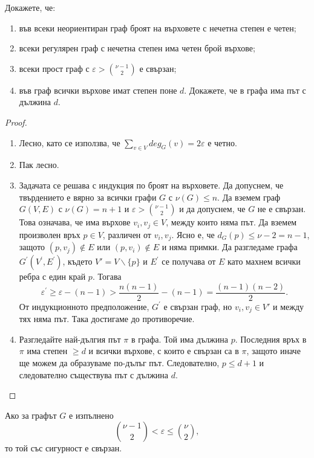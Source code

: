 \begin{problem}
  Докажете, че:
  \begin{enumerate}
  \item
    във всеки неориентиран граф броят на върховете с нечетна степен е четен;
  \item
    всеки регулярен граф с нечетна степен има четен брой върхове;
  \item
    всеки прост граф с $\varepsilon > \binom{\nu-1}{2}$ е свързан;
  \item
    във граф всички върхове имат степен поне $d$.
    Докажете, че в графа има път с дължина $d$.
  \end{enumerate}
\end{problem}
\begin{proof}
  \begin{enumerate}
  \item
    Лесно, като се използва, че $\sum_{v\in V} deg_G(v) = 2\varepsilon$ е четно.
  \item
    Пак лесно.
  \item
    Задачата се решава с индукция по броят на върховете.
    Да допуснем, че твърдението е вярно за всички графи $G$ с $\nu(G)\leq n$.
    Да вземем граф $G(V,E)$ с $\nu(G) = n+1$ и $\varepsilon>\binom{\nu-1}{2}$ и да допуснем, че 
    $G$ не е свързан. Това означава, че има върхове $v_i,v_j\in V$, между които няма път.
    Да вземем произволен връх $p\in V$, различен от $v_i,v_j$.
    Ясно е, че $d_G(p) \leq \nu-2 = n-1$, защото $(p,v_j)\not\in E$ или $(p,v_i)\not\in E$ и няма примки.
    Да разгледаме графа $G^\prime(V^\prime,E^\prime)$, където $V' = V\backslash{\{p\}}$ и 
    $E^\prime$ се получава от $E$ като махнем всички ребра с един край $p$.
    Тогава \[\varepsilon^\prime \geq \varepsilon - (n-1) > \frac{n(n-1)}{2} - (n-1) = \frac{(n-1)(n-2)}{2}.\]
    От индукционното предположение, $G^\prime$ е свързан граф, но $v_i,v_j\in V'$ и между тях няма път.
    Така достигаме до противоречие.
  \item
    Разгледайте най-дългия път $\pi$ в графа.
    Той има дължина $p$. Последния връх в $\pi$ има степен $\geq d$ и всички върхове, с които е свързан 
    са в $\pi$, защото иначе ще можем да образуваме по-дълъг път.
    Следователно, $p \leq d+1$ и следователно съществува път с дължина $d$.
  \end{enumerate}
\end{proof}

\begin{remark}
  Ако за графът $G$ е изпълнено \[\binom{\nu-1}{2} < \varepsilon \leq \binom{\nu}{2},\]
  то той със сигурност е свързан.
\end{remark}

